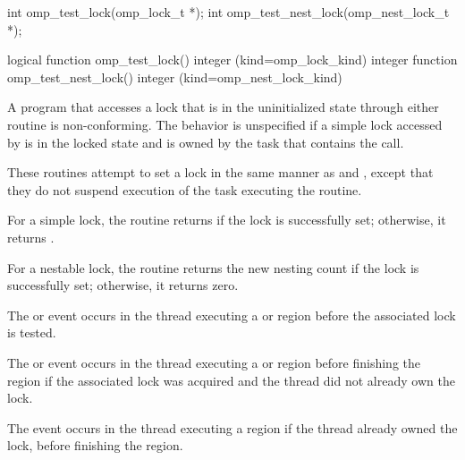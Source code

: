\format
\begin{ccppspecific}
\begin{boxedcode}
int omp\_test\_lock(omp\_lock\_t *);
int omp\_test\_nest\_lock(omp\_nest\_lock\_t *);
\end{boxedcode}
\end{ccppspecific}

\begin{fortranspecific}
\begin{boxedcode}
logical function omp\_test\_lock()
integer (kind=omp\_lock\_kind) 
integer function omp\_test\_nest\_lock()
integer (kind=omp\_nest\_lock\_kind) 
\end{boxedcode}
\end{fortranspecific}

\constraints
A program that accesses a lock that is in the uninitialized state through either routine is 
non-conforming. The behavior is unspecified if a simple lock accessed by 
 is in the locked state and is owned by the task that contains the call.

\effect 
These routines attempt to set a lock in the same manner as  and 
, except that they do not suspend execution of the task 
executing the routine.

For a simple lock, the  routine returns  if the lock is successfully 
set; otherwise, it returns .

For a nestable lock, the  routine returns the new nesting count 
if the lock is successfully set; otherwise, it returns zero.

\events

The  or  event occurs in the thread 
executing a  or  region
before the associated lock is tested.

The  or  event occurs in the thread 
executing a  or  region
before finishing the region if the associated lock was acquired and the thread did not already own the lock. 

The  event occurs in the thread 
executing a  region
if the thread already owned the lock, 
before finishing the region.


\tools


